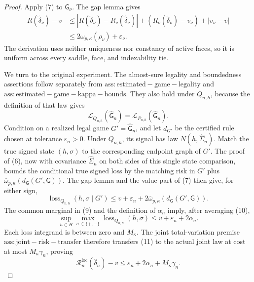 \documentclass{article}
\begin{document}
\begin{proof}
Apply (7) to \(\mathsf G_{\nu}\). The gap lemma gives
\[
\begin{aligned}
 R(\widetilde\delta_{\nu})-v
 &\leq |R(\widetilde\delta_{\nu})-R_{\nu}(\widetilde\delta_{\nu})|
 +(R_{\nu}(\widetilde\delta_{\nu})-v_{\nu})+|v_{\nu}-v|\\
 &\leq2\omega_{p,\kappa}(\rho_{\nu})+\varepsilon_{\nu}.
\end{aligned}\tag{8}
\]
The derivation uses neither uniqueness nor constancy of active faces, so it is uniform across every saddle, face, and indexability tie.

We turn to the original experiment. The almost-sure legality and boundedness assertions follow separately from \(\mathrm{ass:estimated-game-legality}\) and \(\mathrm{ass:estimated-game-kappa-bounds}\). They also hold under \(Q_{n,h}\), because the definition of that law gives
\[
 \mathcal L_{Q_{n,h}}(\widehat{\mathsf G}_n)
 =\mathcal L_{P_{n,h}}(\widehat{\mathsf G}_n). \tag{9}
\]
Condition on a realized legal game \(G'=\widehat{\mathsf G}_n\), and let \(d_{G'}\) be the certified rule chosen at tolerance \(\varepsilon_n>0\). Under \(Q_{n,h}\), its signal has law \(N(h,\widehat\Sigma_n)\). Match the true signed state \((h,\sigma)\) to the corresponding endpoint graph of \(G'\). The proof of (6), now with covariance \(\widehat\Sigma_n\) on both sides of this single state comparison, bounds the conditional true signed loss by the matching risk in \(G'\) plus \(\overline\omega_{p,\kappa}(d_{\mathsf G}(G',\mathsf G))\). The gap lemma and the value part of (7) then give, for either sign,
\[
 \operatorname{loss}_{Q_{n,h}}(h,\sigma\mid G')
 \leq v+\varepsilon_n
 +2\overline\omega_{p,\kappa}(d_{\mathsf G}(G',\mathsf G)). \tag{10}
\]
The common marginal in (9) and the definition of \(\alpha_n\) imply, after averaging (10),
\[
 \sup_{h\in H}\max_{\sigma\in\{+,-\}}
 \operatorname{loss}_{Q_{n,h}}(h,\sigma)
 \leq v+\varepsilon_n+2\alpha_n. \tag{11}
\]
Each loss integrand is between zero and \(M_{\kappa}\). The joint total-variation premise \(\mathrm{ass:joint-risk-transfer}\) therefore transfers (11) to the actual joint law at cost at most \(M_{\kappa}\gamma_n\), proving
\[
 \mathcal R_n^{\mathrm{loc}}(\widehat\delta_n)-v
 \leq\varepsilon_n+2\alpha_n+M_{\kappa}\gamma_n. \tag{12}
\]


\end{proof}
\end{document}
